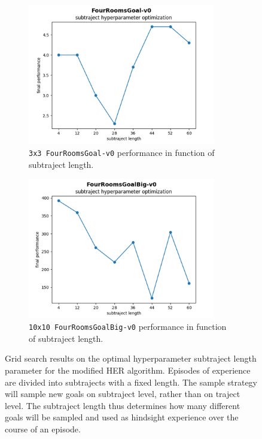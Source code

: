 \documentclass[conference]{IEEEtran}
\begin{document}
\begin{figure}[ht]
\centering
\begin{subfigure}[t]{0.45\textwidth}
\centering
\includegraphics[width=0.9\textwidth]{img/exp_tabular_her_gridsearch_small.png}
\caption{\texttt{3x3 FourRoomsGoal-v0} performance in function of subtraject length.}
\label{fig:experiment_subtraject_gridsearch_small}
\end{subfigure}
\hspace{1em}
\begin{subfigure}[t]{0.45\textwidth}
\centering
\includegraphics[width=0.9\textwidth]{img/exp_tabular_her_gridsearch_big.png}
\caption{\texttt{10x10 FourRoomsGoalBig-v0} performance in function of subtraject length.}
\label{fig:experiment_subtraject_gridsearch_big}
\end{subfigure}
\caption{Grid search results on the optimal hyperparameter subtraject length parameter for the modified HER algorithm. Episodes of experience are divided into subtrajects with a fixed length. The sample strategy will sample new goals on subtraject level, rather than on traject level. The subtraject length thus determines how many different goals will be sampled and used as hindsight experience over the course of an episode.}
\label{fig:experiment_subtraject_gridsearch}
\end{figure}
\end{document}
